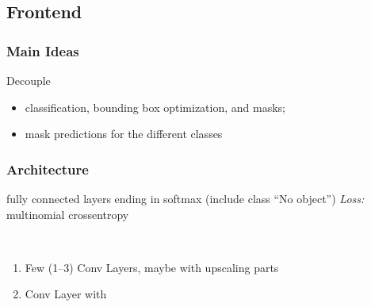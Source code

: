 \subsection{Frontend}
\begin{frame}[<+->]
  \frametitle{Main Ideas}
  Decouple
  \begin{itemize}
  \item classification, bounding box optimization, and masks;
  \item mask predictions for the different classes
  \end{itemize}
\end{frame}


\begin{frame}[t]
  \frametitle{Architecture}
  \begin{description}[<only@+>]
  \item[Classification]
    fully connected layers ending in softmax
    (include class \enquote{No object})%
    \emph{Loss:} multinomial crossentropy
  \item<only@+>[Mask generation]~
    \begin{enumerate}[<.->]
    \item Few (1--3) Conv Layers,
      maybe with upscaling parts
    \item Conv Layer with
      \begin{itemize}

\end{itemize}
\end{enumerate}
\end{description}
\end{frame}
